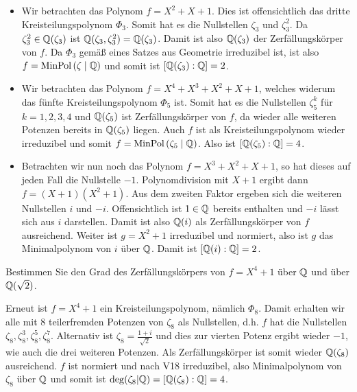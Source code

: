 \begin{exercisePage}
	\begin{itemize}[leftmargin=*]
		\item Wir betrachten das Polynom $f = X^2 + X + 1$. Dies ist offensichtlich das dritte Kreisteilungspolynom $\Phi_3$. Somit hat es die Nullstellen $\zeta_3$ und $\zeta_3^2$. Da $\zeta_3^2 \in \mathbb{Q}(\zeta_3)$ ist $\mathbb{Q}(\zeta_3 , \zeta_3^2) = \mathbb{Q}(\zeta_3)$. Damit ist also $\mathbb{Q}(\zeta_3)$ der Zerfällungskörper von $f$. Da $\Phi_3$ gemäß eines Satzes aus Geometrie irreduzibel ist, ist also $f = \operatorname{MinPol}\left( \zeta \mathrel{|} \mathbb{Q}\right)$ und somit ist $[\mathbb{Q}(\zeta_3) : \mathbb{Q}] =  2$.
		\item Wir betrachten das Polynom $f = X^4 + X^3 + X^2 + X + 1$, welches widerum das fünfte Kreisteilungspolynom $\Phi_5$ ist. Somit hat es die Nullstellen $\zeta_5^k$ für $k = 1,2,3,4$ und $\mathbb{Q}(\zeta_5)$ ist Zerfällungskörper von $f$, da wieder alle weiteren Potenzen bereits in $\mathbb{Q}(\zeta_5)$ liegen. Auch $f$ ist als Kreisteilungspolynom wieder irreduzibel und somit $f = \operatorname{MinPol}\left( \zeta_5 \mathrel{|} \mathbb{Q}\right)$. Also ist $[\mathbb{Q}(\zeta_5) : \mathbb{Q}] = 4$.
		\item Betrachten wir nun noch das Polynom $f = X^3 + X^2 + X + 1$, so hat dieses auf jeden Fall die Nullstelle $-1$. Polynomdivision mit $X + 1$ ergibt dann $f = (X+1)(X^2+1)$. Aus dem zweiten Faktor ergeben sich die weiteren Nullstellen $i$ und $-i$. Offensichtlich ist $1 \in \mathbb{Q}$ bereits enthalten und $-i$ lässt sich aus $i$ darstellen. Damit ist also $\mathbb{Q}(i)$ als Zerfällungskörper von $f$ ausreichend. Weiter ist $g = X^2 + 1$ irreduzibel und normiert, also ist $g$ das Minimalpolynom von $i$ über $\mathbb{Q}$. Damit ist $[\mathbb{Q}(i) : \mathbb{Q}] = 2$.
	\end{itemize}
	
	\pagebreak
	
	\begin{homework}
		Bestimmen Sie den Grad des Zerfällungskörpers von $f = X^4 + 1$ über $\mathbb{Q}$ und über $\mathbb{Q}(\sqrt{2})$.
	\end{homework}
	
	Erneut ist $f = X^4 + 1$ ein Kreisteilungspolynom, nämlich $\Phi_8$. Damit erhalten wir alle mit $8$ teilerfremden Potenzen von $\zeta_8$ als Nullstellen, d.h. $f$ hat die Nullstellen $\zeta_8, \zeta_8^3, \zeta_8^5, \zeta_8^7$. Alternativ ist $\zeta_8 = \frac{1+i}{\sqrt{2}}$ und dies zur vierten Potenz ergibt wieder $-1$, wie auch die drei weiteren Potenzen.
	Als Zerfällungskörper ist somit wieder $\mathbb{Q}(\zeta_8)$ ausreichend. $f$ ist normiert und nach V18 irreduzibel, also Minimalpolynom von $\zeta_8$ über $\mathbb{Q}$ und somit ist $\deg(\zeta_8 | \mathbb{Q}) = [\mathbb{Q}(\zeta_8) : \mathbb{Q}] = 4$.
	

\end{exercisePage}
